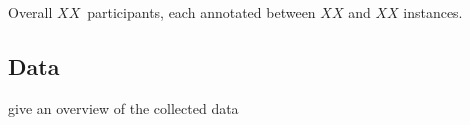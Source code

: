 Overall $XX$~participants, each annotated between $XX$ and $XX$ instances. 

\subsection{Data} give an overview of the collected data



